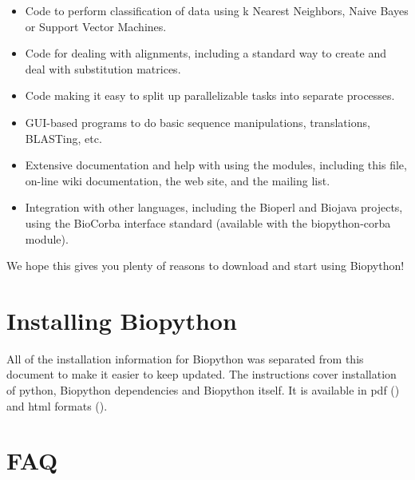 \documentclass{report}
\begin{document}
\begin{itemize}
  \item Code to perform classification of data using k Nearest Neighbors, Naive Bayes or Support Vector Machines.

  \item Code for dealing with alignments, including a standard way to create and deal with substitution matrices.

  \item Code making it easy to split up parallelizable tasks into separate processes.

  \item GUI-based programs to do basic sequence manipulations, translations, BLASTing, etc.

  \item Extensive documentation and help with using the modules, including this file, on-line wiki documentation, the web site, and the mailing list.

  \item Integration with other languages, including the Bioperl and Biojava projects, using the BioCorba interface standard (available with the biopython-corba module).

\end{itemize}

We hope this gives you plenty of reasons to download and start using Biopython!

\section{Installing Biopython}

All of the installation information for Biopython was separated from
this document to make it easier to keep updated. The instructions cover
installation of python, Biopython dependencies and Biopython itself.
It is available in pdf
()
and html formats
().

\section{FAQ}
\end{document}
